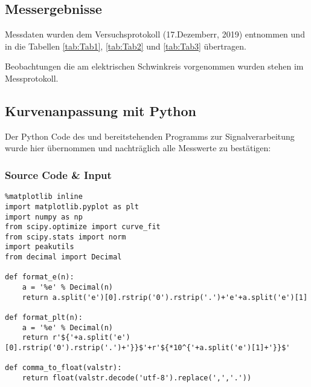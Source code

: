 \documentclass[a4paper,10pt]{article}
\begin{document}
\subsection{Messergebnisse}
Messdaten wurden dem Versuchsprotokoll (17.Dezemberr, 2019) entnommen und in die Tabellen \ref{tab:Tab1}, \ref{tab:Tab2} und \ref{tab:Tab3} übertragen.

Beobachtungen die am elektrischen Schwinkreis vorgenommen wurden stehen im Messprotokoll.

\subsection{Kurvenanpassung mit Python}
Der Python Code des und bereitstehenden Programms zur Signalverarbeitung wurde hier übernommen und nachträglich alle Messwerte zu bestätigen:
\subsubsection{Source Code \& Input}
\begin{lstlisting}
%matplotlib inline
import matplotlib.pyplot as plt
import numpy as np
from scipy.optimize import curve_fit
from scipy.stats import norm
import peakutils
from decimal import Decimal

def format_e(n):
    a = '%e' % Decimal(n)
    return a.split('e')[0].rstrip('0').rstrip('.')+'e'+a.split('e')[1]

def format_plt(n):
    a = '%e' % Decimal(n)
    return r'${'+a.split('e')[0].rstrip('0').rstrip('.')+'}}$'+r'${*10^{'+a.split('e')[1]+'}}$'

def comma_to_float(valstr):
    return float(valstr.decode('utf-8').replace(',','.'))
\end{lstlisting}
\end{document}
